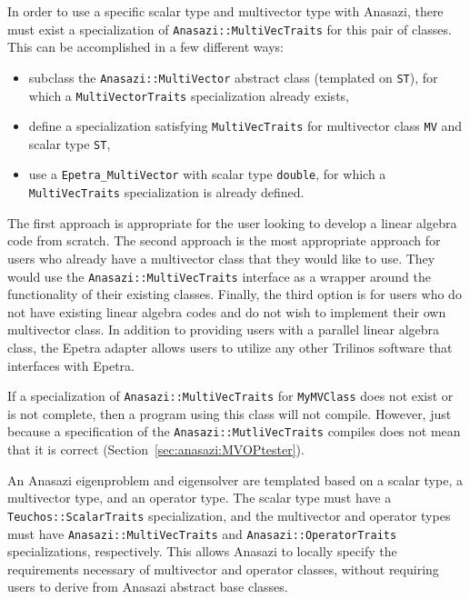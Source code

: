 In order to use a specific scalar type and multivector type with Anasazi, there
must exist a specialization of \verb!Anasazi::MultiVecTraits! for this pair of
classes. This can be accomplished in a few different ways:
\begin{itemize}
\item subclass the \verb!Anasazi::MultiVector! abstract class (templated on
\verb!ST!), for which a \verb!MultiVectorTraits! specialization already exists,
\item define a specialization satisfying \verb!MultiVecTraits! for multivector
class \verb!MV! and scalar type \verb!ST!,
\item use a \verb!Epetra_MultiVector! with scalar type \verb!double!, 
for which a \verb!MultiVecTraits! specialization is already defined.
\end{itemize}

The first approach is appropriate for the user looking to develop a linear
algebra code from scratch.  The second approach is the most appropriate approach
for users who already have a multivector class that they would like to use. They
would use the \verb!Anasazi::MultiVecTraits!  interface as a wrapper around the
functionality of their existing classes.  Finally, the third option is for users
who do not have existing linear algebra codes and do not wish to implement their
own multivector class.  In addition to providing users with a parallel linear
algebra class, the Epetra adapter allows users to utilize any other Trilinos
software that interfaces with Epetra.

If a specialization of \verb!Anasazi::MultiVecTraits! for \verb!MyMVClass! does
not exist or is not complete, then a program using this class will not compile.
However, just because a specification of the \verb!Anasazi::MutliVecTraits!
compiles does not mean that it is correct
(Section~\ref{sec:anasazi:MVOPtester}).

\begin{remark} 
An Anasazi eigenproblem and eigensolver are templated based on a scalar type, a
multivector type, and an operator type. The scalar type must have a
\verb!Teuchos::ScalarTraits! specialization, and the multivector and operator
types must have \verb!Anasazi::MultiVecTraits! and
\verb!Anasazi::OperatorTraits! specializations, respectively. This allows
Anasazi to locally specify the requirements necessary of multivector and
operator classes, without requiring users to derive
from Anasazi abstract base classes.
\end{remark}



